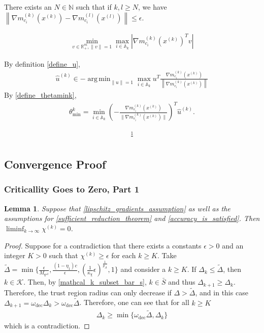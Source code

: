 \documentclass{article}
\newtheorem{lemma}[theorem]{Lemma}
\theoremstyle{case}
\numberwithin{theorem}{subsection}
\DeclareMathOperator*{\argmin}{arg\,min}
\newcommand{\activeconstraintsk}{{\mathbb A_{k}}}
\newcommand{\chik}{{\chi^{(k)}}}
\newcommand{\dk}{\Delta_k}
\newcommand{\dkpo}{\Delta_{k+1}}
\newcommand{\gmcik}{{\nabla m_{c_i}^{(k)}\left(\xk\right)}}
\newcommand{\hgik}{{\frac{\nabla m^{(k)}_{c_i}(\xk)}{\|\nabla m^{(k)}_{c_i}(\xk)\|}}}
\newcommand{\huk}{{{\hat u}^{(k)}}}
\newcommand{\maxhessian}{{M_{\nabla^2}}}
\newcommand{\mcik}{{{m}^{(k)}_{c_i}}}
\newcommand{\mcil}{{{m}^{(l)}_{c_i}}}
\newcommand{\naturals}{\mathbb N}
\newcommand{\omegadec}{\omega_{\text{dec}}}
\newcommand{\Rm}{\mathbb R^m}
\newcommand{\thetamink}{{\theta^k_{\textrm{min}}}}
\newcommand{\xk}{{x^{(k)}}}
\newcommand{\xl}{{x^{(l)}}}
\begin{document}
There exists an $N \in \naturals$ such that if $k, l \ge N$, we have $\left\|\nabla \mcik\left(\xk\right) - \nabla \mcil\left(\xl\right) \right\| \le \epsilon$.

\begin{align*}
\min_{v \in \Rm_+, \|v\| = 1} \max_{i \in \activeconstraintsk} \left|\gmcik^T v\right|
\end{align*}


By definition \cref{define_u},
\begin{align*}
\huk \in -\argmin_{\|u\| = 1} \max_{i \in \activeconstraintsk} u^T \frac{\gmcik}{\left\|\gmcik\right\|}
\end{align*}
By \cref{define_thetamink},
\begin{align*}
\thetamink = \min_{i \in \activeconstraintsk} \left(-\hgik\right)^T \huk.
\end{align*}



\begin{align*}
\frac 1 {}
\end{align*}




\subsection{Convergence Proof}
\subsubsection{Criticallity Goes to Zero, Part 1}
\begin{lemma}
\label{liminf_chi_to_zero}
Suppose that \cref{lipschitz_gradients_assumption} as well as the assumptions for \cref{sufficient_reduction_theorem} and \cref{accuracy_is_satisfied}.
Then $\liminf_{k\to\infty} \chik = 0$.
\end{lemma}
 

\begin{proof}
Suppose for a contradiction that there exists a constants $\epsilon > 0$ and an integer $K > 0$ such that $\chik \ge \epsilon$ for each $k \ge K$.
Take $ \tilde \Delta = \min \{\frac{\epsilon}{\maxhessian}, \frac{(1 - \eta_1)c}{\epsilon}, \left(\frac 1 {\kappa_{\chi}}  \epsilon \right)^{\frac 1 {p_{\Delta}}}, 1\}$
and consider a $k \ge K$.
If $\dk \le \tilde \Delta$, then $k \in \mathcal K$.
Then, by \cref{mathcal_k_subset_bar_s},  $k \in \bar S$ and thus $\dkpo \ge \dk$.
Therefore, the trust region radius can only decrease if $\Delta > \tilde \Delta$, and in this case $\dkpo = \omegadec\dk > \omegadec \tilde \Delta$.
Therefore, one can see that for all $k \ge K$
\begin{align}
\dk \ge \min\{\omegadec \tilde \Delta, \dk \}
\end{align}
which is a contradiction.
\end{proof}
\end{document}
